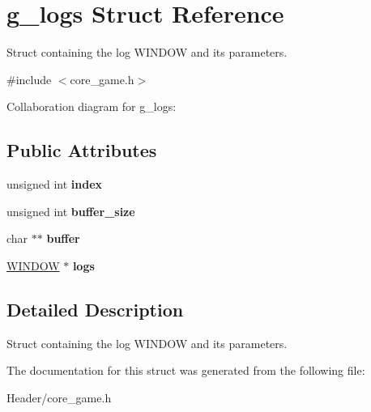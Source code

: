 \hypertarget{structg__logs}{}\section{g\+\_\+logs Struct Reference}
\label{structg__logs}


Struct containing the log W\+I\+N\+D\+OW and its parameters.  




{\ttfamily \#include $<$core\+\_\+game.\+h$>$}



Collaboration diagram for g\+\_\+logs\+:
\subsection*{Public Attributes}
\begin{DoxyCompactItemize}
\item 
\mbox{\label{structg__logs_af5007c431d8403b7784758482980b326}} 
unsigned int {\bfseries index}
\item 
\mbox{\label{structg__logs_ab4ff8b61d54b1ead00b743eaa87c51da}} 
unsigned int {\bfseries buffer\+\_\+size}
\item 
\mbox{\label{structg__logs_a463ac14d1cd89e0dbde8ca3dfd99361e}} 
char $\ast$$\ast$ {\bfseries buffer}
\item 
\mbox{\label{structg__logs_a65c7ab66e672f12936a9e44839847c88}} 
\hyperlink{struct__win}{W\+I\+N\+D\+OW} $\ast$ {\bfseries logs}
\end{DoxyCompactItemize}


\subsection{Detailed Description}
Struct containing the log W\+I\+N\+D\+OW and its parameters. 

The documentation for this struct was generated from the following file\+:\begin{DoxyCompactItemize}
\item 
Header/core\+\_\+game.\+h\end{DoxyCompactItemize}

